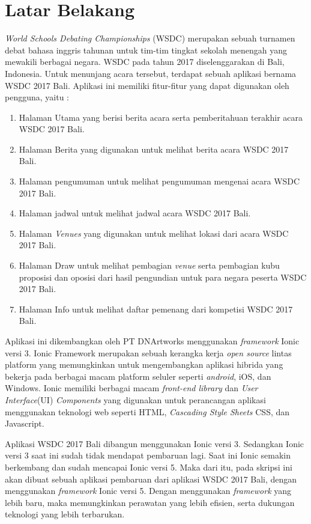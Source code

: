 \documentclass[a4paper,twoside]{article}
\begin{document}
\section{Latar Belakang}
\textit{World Schools Debating Championships} (WSDC) merupakan sebuah turnamen debat bahasa inggris tahunan untuk tim-tim tingkat sekolah menengah yang mewakili berbagai negara. WSDC pada tahun 2017 diselenggarakan di Bali, Indonesia. Untuk menunjang acara tersebut, terdapat sebuah aplikasi bernama WSDC 2017 Bali. Aplikasi ini memiliki fitur-fitur yang dapat digunakan oleh pengguna, yaitu : 

\begin{enumerate}
	\item Halaman Utama yang berisi berita acara serta pemberitahuan terakhir acara WSDC 2017 Bali.
	\item Halaman Berita yang digunakan untuk melihat berita acara WSDC 2017 Bali.
	\item Halaman pengumuman untuk melihat pengumuman mengenai acara WSDC 2017 Bali.
	\item Halaman jadwal untuk melihat jadwal acara WSDC 2017 Bali.
	\item Halaman \textit{Venues} yang digunakan untuk melihat lokasi dari acara WSDC 2017 Bali.
	\item Halaman Draw untuk melihat pembagian \textit{venue} serta pembagian kubu proposisi dan oposisi dari hasil pengundian untuk para negara peserta WSDC 2017 Bali.
	\item Halaman Info untuk melihat daftar pemenang dari kompetisi WSDC 2017 Bali.
\end{enumerate}

Aplikasi ini dikembangkan oleh PT DNArtworks menggunakan \textit{framework} Ionic versi 3. Ionic Framework merupakan sebuah kerangka kerja {\it open source} lintas platform yang memungkinkan untuk mengembangkan aplikasi hibrida yang bekerja pada berbagai macam platform seluler seperti {\it android}, iOS, dan Windows. Ionic memiliki berbagai macam \textit{front-end library} dan \textit{User Interface}(UI) {\it Components} yang digunakan untuk  perancangan aplikasi menggunakan teknologi web seperti HTML, {\it Cascading Style Sheets} CSS, dan Javascript. 

Aplikasi WSDC 2017 Bali dibangun menggunakan Ionic versi 3. Sedangkan Ionic versi 3 saat ini sudah tidak mendapat pembaruan lagi. Saat ini Ionic semakin berkembang dan sudah mencapai Ionic versi 5. Maka dari itu, pada skripsi ini akan dibuat sebuah aplikasi pembaruan dari aplikasi WSDC 2017 Bali, dengan menggunakan \textit{framework} Ionic versi 5. Dengan menggunakan \textit{framework} yang lebih baru, maka memungkinkan perawatan yang lebih efisien, serta dukungan teknologi yang lebih terbarukan.
\end{document}
